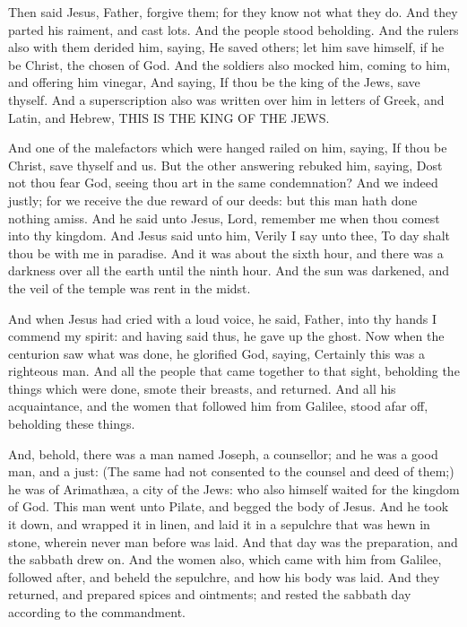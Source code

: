  Then said Jesus, Father, forgive them; for they know not
what they do. And they parted his raiment, and cast lots. 
And the people stood beholding. And the rulers also with them derided
him, saying, He saved others; let him save himself, if he be Christ, the
chosen of God.  And the soldiers also mocked him, coming to
him, and offering him vinegar,  And saying, If thou be the
king of the Jews, save thyself.  And a superscription also
was written over him in letters of Greek, and Latin, and Hebrew, THIS IS
THE KING OF THE JEWS.

 And one of the malefactors which were hanged railed on
him, saying, If thou be Christ, save thyself and us.  But
the other answering rebuked him, saying, Dost not thou fear God, seeing
thou art in the same condemnation?  And we indeed justly;
for we receive the due reward of our deeds: but this man hath done
nothing amiss.  And he said unto Jesus, Lord, remember me
when thou comest into thy kingdom.  And Jesus said unto
him, Verily I say unto thee, To day shalt thou be with me in paradise.
 And it was about the sixth hour, and there was a darkness
over all the earth until the ninth hour.  And the sun was
darkened, and the veil of the temple was rent in the midst.

 And when Jesus had cried with a loud voice, he said,
Father, into thy hands I commend my spirit: and having said thus, he
gave up the ghost.  Now when the centurion saw what was
done, he glorified God, saying, Certainly this was a righteous man.
 And all the people that came together to that sight,
beholding the things which were done, smote their breasts, and returned.
 And all his acquaintance, and the women that followed him
from Galilee, stood afar off, beholding these things.

 And, behold, there was a man named Joseph, a counsellor;
and he was a good man, and a just:  (The same had not
consented to the counsel and deed of them;) he was of Arimathæa, a city
of the Jews: who also himself waited for the kingdom of God.
 This man went unto Pilate, and begged the body of Jesus.
 And he took it down, and wrapped it in linen, and laid it
in a sepulchre that was hewn in stone, wherein never man before was
laid.  And that day was the preparation, and the sabbath
drew on.  And the women also, which came with him from
Galilee, followed after, and beheld the sepulchre, and how his body was
laid.  And they returned, and prepared spices and
ointments; and rested the sabbath day according to the commandment.

